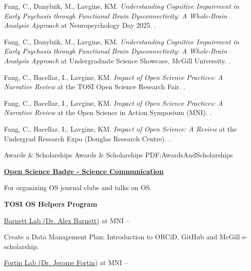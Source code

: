 \documentclass[a4paper,12pt]{article}
\begin{document}
\begin{Body}
\NumberedItem{[2]}
{Fang, C., Danyluik, M., Lavgine, KM.
\textit{Understanding Cognitive Impairment in Early Psychosis through Functional Brain Dysconnectivity: A Whole-Brain Analysis Approach} at Neuropsychology Day 2025.
.}

\NumberedItem{[2]}
{Fang, C., Danyluik, M., Lavgine, KM.
\textit{Understanding Cognitive Impairment in Early Psychosis through Functional Brain Dysconnectivity: A Whole-Brain Analysis Approach} at Undergraduate Science Showcase, McGill University.
.}

\NumberedItem{[3]}
{Fang, C., Bacellar, I., Lavgine, KM.
\textit{Impact of Open Science Practices: A Narrative Review} at the TOSI Open Science Research Fair.
.}

\Gap
\NumberedItem{[4]}
{Fang, C., Bacellar, I., Lavgine, KM.
\textit{Impact of Open Science Practices: A Narrative Review} at the Open Science in Action Symposium (MNI).
.}

\Gap
\NumberedItem{[5]}
{Fang, C., Bacellar, I., Lavgine, KM.
\textit{Impact of Open Science: A Review}
at the Undergrad Research Expo (Douglas Research Centre).
.}

\endgroup


\Section
{Awards \&\newline
Scholarships}
{Awards \& Scholarships}
{PDF:AwardsAndScholarships}

\href{https://openscienceofficehours.github.io/osoh_website/os-badges/}
{\textbf{Open Science Badge - Science Communication}}
\hfill
{}
\begin{Detail}
For organizing OS journal clubs and talks on OS.
\end{Detail}


\BigGap
\textbf{TOSI OS Helpers Program}

\Gap
\BulletItem
\href{https://www.mcgill.ca/neuro/jerome-fortin-phd}
{Barnett Lab (Dr. Alex Barnett)} at MNI
\hfill
{} -- 

\begin{Detail}
\SubBulletItem
Create a Data Management Plan; Introduction to ORCiD, GitHub and McGill e-scholarship.
\end{Detail}

\BulletItem
\href{https://www.mcgill.ca/neuro/jerome-fortin-phd}
{Fortin Lab (Dr. Jerome Fortin)} at MNI
\hfill
{} -- 


\end{Body}
\end{document}
